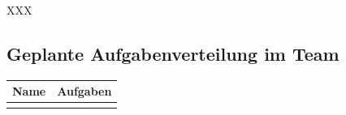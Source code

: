 
XXX


\clearpage

\subsection{Geplante Aufgabenverteilung im Team }

{\def\arraystretch{1.25}\tabcolsep=5pt
\begin{longtable}{|l|p{26em}|}
	\hline
	\textbf{Name} & \textbf{Aufgaben}
	\\ \hline \hline
	\endfirsthead
	
	\hline
	\endhead
	
	\hline
	\endfoot


\end{longtable}}
